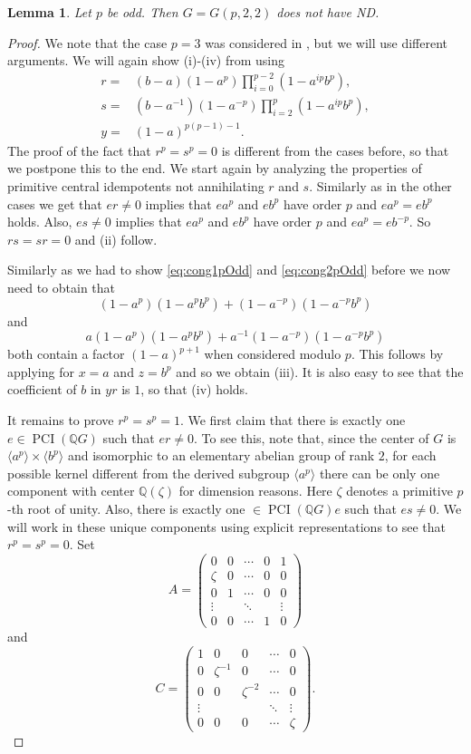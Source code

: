 \documentclass[a4paper,10pt]{amsart}
\newtheorem{lemma}{Lemma}[section]
\theoremstyle{definition}
\theoremstyle{remark}
\newcommand\PCI{\operatorname{PCI}}
\newcommand{\Q}{{\mathbb Q}}
\begin{document}
\begin{lemma}\label{lem:GpmnOddCase3}
Let $p$ be odd. Then $G = G(p,2,2)$ does not have ND. 
\end{lemma}
\begin{proof}
We note that the case $p = 3$ was considered in \cite[Lemma 2.2]{LiuPassman10}, but we will use different arguments. We will again show (i)-(iv) from  using
\begin{align*}
r =& (b-a)(1-a^p)\prod_{i=0}^{p-2}(1-a^{ip}b^p), \\
s =& (b-a^{-1})(1-a^{-p})\prod_{i=2}^p(1-a^{ip}b^p), \\
y =& (1-a)^{p(p-1)-1}.
\end{align*}
The proof of the fact that $r^p = s^p = 0$ is different from the cases before, so that we postpone this to the end. We start again by analyzing the properties of primitive central idempotents not annihilating $r$ and $s$. Similarly as in the other cases we get that $er \neq 0$ implies that $ea^p$ and $eb^p$ have order $p$ and $ea^p = eb^p$ holds. Also, $es\neq 0$ implies that $ea^p$ and $eb^p$ have order $p$ and $ea^p = eb^{-p}$. So $rs = sr = 0$ and (ii) follow.

Similarly as we had to show \eqref{eq:cong1pOdd} and \eqref{eq:cong2pOdd} before we now need to obtain that
\[(1-a^p)(1-a^pb^p) + (1-a^{-p})(1-a^{-p}b^p) \]
and
\[a(1-a^p)(1-a^pb^p) + a^{-1}(1-a^{-p})(1-a^{-p}b^p) \]
both contain a factor $(1-a)^{p+1}$ when considered modulo $p$. This follows by applying  for $x = a$ and $z = b^p$ and so we obtain (iii). It is also easy to see that the coefficient of $b$ in $yr$ is $1$, so that (iv) holds.

It remains to prove $r^p = s^p = 1$. We first claim that there is exactly one $e \in \PCI(\mathbb{Q}G)$ such that $er \neq 0$. To see this, note that, since the center of $G$ is $\langle a^p \rangle \times \langle b^p \rangle$ and isomorphic to an elementary abelian group of rank $2$, for each possible kernel different from the derived subgroup $\langle a^p \rangle$ there can be only one component with center $\mathbb{Q}(\zeta)$ for dimension reasons. Here $\zeta$ denotes a primitive $p$-th root of unity. Also, there is exactly one $ \in \PCI(\Q G)e$ such that $es \neq 0$. We will work in these unique components using explicit representations to see that $r^p = s^p = 0$. Set 
\[A = \begin{pmatrix} 0 & 0 & \cdots & 0 & 1 \\ \zeta & 0 &  \cdots & 0 & 0 \\ 0 & 1 &  \cdots & 0 & 0 \\ \vdots & & \ddots &  & \vdots \\ 0 & 0 & \cdots & 1 & 0 \end{pmatrix}\]
and
\[C = \begin{pmatrix} 1 & 0 & 0 & \cdots & 0 \\ 0 & \zeta^{-1} & 0 & \cdots & 0 \\ 0 & 0 & \zeta^{-2} & \cdots & 0 \\ \vdots & & & \ddots & \vdots \\ 0 & 0 & 0 &  \cdots & \zeta \end{pmatrix}.\]


\end{proof}
\end{document}
